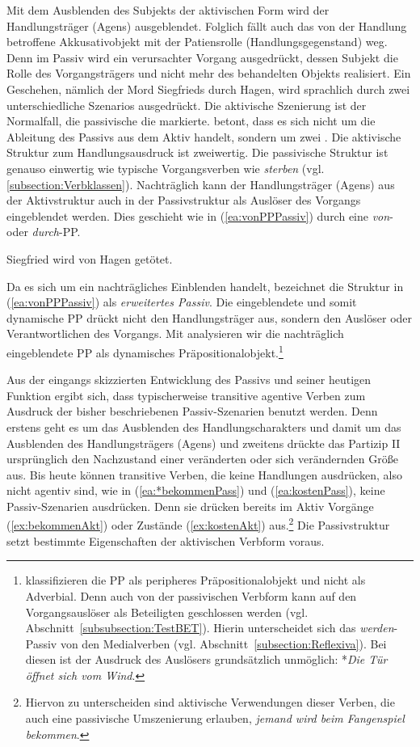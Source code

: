 Mit dem Ausblenden des Subjekts der aktivischen Form wird der Handlungsträger (Agens) ausgeblendet. Folglich fällt auch das von der Handlung betroffene Akkusativobjekt mit der Patiensrolle (Handlungsgegenstand) weg. Denn im Passiv wird ein verursachter Vorgang ausgedrückt, dessen Subjekt die Rolle des Vorgangsträgers und nicht mehr des behandelten Objekts realisiert. Ein Geschehen, nämlich der Mord Siegfrieds durch Hagen, wird sprachlich durch zwei unterschiedliche Szenarios ausgedrückt. Die aktivische Szenierung ist der Normalfall, die passivische die markierte. \citet[277]{Agel2017} betont, dass es sich nicht um die Ableitung des Passivs aus dem Aktiv handelt, sondern um zwei . Die aktivische Struktur zum Handlungsausdruck ist zweiwertig. Die passivische Struktur ist genauso einwertig wie typische Vorgangsverben wie \textit{sterben} (vgl. \ref{subsection:Verbklassen}). Nachträglich kann der Handlungsträger (Agens) aus der Aktivstruktur auch in der Passivstruktur als Auslöser des Vorgangs eingeblendet werden. Dies geschieht wie in (\ref{ea:vonPPPassiv}) durch eine \textit{von}- oder \textit{durch}-PP. 

\ea \label{ea:vonPPPassiv} Siegfried wird von Hagen getötet.
\z 

Da es sich um ein nachträgliches Einblenden handelt, bezeichnet \citet[167]{Weinrich2003} die Struktur in (\ref{ea:vonPPPassiv}) als \textit{erweitertes Passiv}. Die eingeblendete und somit dynamische PP drückt nicht den Handlungsträger aus, sondern den Auslöser oder Verantwortlichen des Vorgangs. Mit \citet[277]{Agel2017} analysieren wir die nachträglich eingeblendete PP als dynamisches Präpositionalobjekt.\footnote{\citet[1097--1098]{ZifHoffStr1997} klassifizieren die PP als peripheres Präpositionalobjekt und nicht als Adverbial. Denn auch von der passivischen Verbform kann auf den Vorgangsauslöser als Beteiligten geschlossen werden (vgl. Abschnitt~\ref{subsubsection:TestBET}). Hierin unterscheidet sich das \textit{werden}-Passiv von den Medialverben (vgl. Abschnitt~\ref{subsection:Reflexiva}). Bei diesen ist der Ausdruck des Auslösers grundsätzlich unmöglich: *\textit{Die Tür öffnet sich vom Wind}.} 

Aus der eingangs skizzierten Entwicklung des Passivs und seiner heutigen Funktion ergibt sich, dass typischerweise transitive agentive Verben zum Ausdruck der bisher beschriebenen Passiv-Szenarien benutzt werden. Denn erstens geht es um das Ausblenden des Handlungscharakters und damit um das Ausblenden des Handlungsträgers (Agens) und zweitens drückte das Partizip II ursprünglich den Nachzustand einer veränderten oder sich verändernden Größe aus. Bis heute können transitive Verben, die keine Handlungen ausdrücken, also nicht agentiv sind, wie in (\ref{ea:*bekommenPass}) und (\ref{ea:kostenPass}), keine Passiv-Szenarien ausdrücken. Denn sie drücken bereits im Aktiv Vorgänge (\ref{ex:bekommenAkt}) oder Zustände (\ref{ex:kostenAkt}) aus.\footnote{Hiervon zu unterscheiden sind aktivische Verwendungen dieser Verben, die auch eine passivische Umszenierung erlauben, \zB \textit{jemand wird beim Fangenspiel bekommen}.} Die Passivstruktur setzt bestimmte Eigenschaften der aktivischen Verbform voraus.


